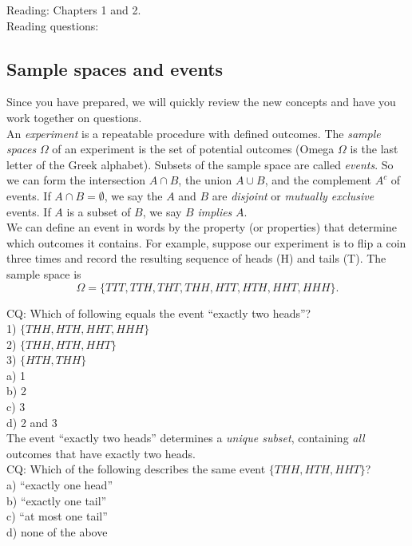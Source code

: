 \documentclass[12pt]{article}
\begin{document}
Reading: Chapters 1 and 2.\\

Reading questions:

\subsection{Sample spaces and events}


Since you have prepared, we will quickly review the new concepts and have you work together on questions.\\

An {\em experiment} is a repeatable procedure with defined outcomes.  The {\em sample spaces} $\Omega$ of an experiment is the set of potential outcomes (Omega $\Omega$ is the last letter of the Greek alphabet).  Subsets of the sample space are called {\em events}.  So we can form the intersection $A \cap B$, the union $A \cup B$, and the complement $A^c$ of events.  If $A \cap B = \emptyset$, we say the $A$ and $B$ are {\em disjoint} or {\em mutually exclusive} events.  If $A$ is a subset of $B$, we say $B$ {\em implies} $A$. \\

We can define an event in words by the property (or properties) that determine which outcomes it contains.  For example, suppose our experiment is to flip a coin three times and record the resulting sequence of heads (H) and tails (T).  The sample space is $$\Omega = \{TTT, TTH, THT, THH, HTT, HTH, HHT, HHH\}.$$  

CQ: Which of following equals the event ``exactly two heads''? \\
1) $\{THH, HTH, HHT, HHH\}$ \\
2) $\{THH, HTH, HHT\}$ \\
3) $\{HTH, THH\}$ \\
a) 1 \\
b) 2 \\
c) 3 \\
d) 2 and 3 \\

The event ``exactly two heads'' determines a {\em unique subset}, containing {\em all} outcomes that have exactly two heads.\\

CQ: Which of the following describes the same event $\{THH, HTH, HHT\}$? \\
a) ``exactly one head'' \\
b) ``exactly one tail'' \\
c) ``at most one tail'' \\
d) none of the above \\
\end{document}
